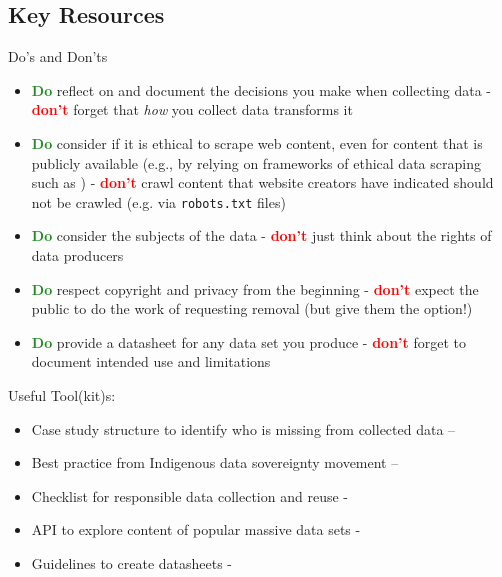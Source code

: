 \subsection{Key Resources}
Do's and Don'ts
\begin{itemize}
    \item \textcolor{ForestGreen}{\textbf{Do}} reflect on and document the decisions you make when collecting data - \textcolor{red}{\textbf{don't}} forget that \textit{how} you collect data transforms it 
    \item \textcolor{ForestGreen}{\textbf{Do}} consider if it is ethical to scrape web content, even for content that is publicly available (e.g., by relying on frameworks of ethical data scraping such as \citet{mancosu_what_2020}) - \textcolor{red}{\textbf{don't}} crawl content that website creators have indicated should not be crawled (e.g. via \texttt{robots.txt} files)
    \item \textcolor{ForestGreen}{\textbf{Do}} consider the subjects of the data - \textcolor{red}{\textbf{don't}} just think about the rights of data producers
    \item \textcolor{ForestGreen}{\textbf{Do}} respect copyright and privacy from the beginning - \textcolor{red}{\textbf{don't}} expect the public to do the work of requesting removal (but give them the option!)
    \item \textcolor{ForestGreen}{\textbf{Do}} provide a datasheet for any data set you produce - \textcolor{red}{\textbf{don't}} forget to document intended use and limitations
\end{itemize}

\noindent Useful Tool(kit)s: 
\begin{itemize}
    \item Case study structure to identify who is missing from collected data -- \citet{markl_mind_2022}
    \item Best practice from Indigenous data sovereignty movement -- \citet{walter_indigenous_2021}
    \item Checklist for responsible data collection and reuse - \citet{rogers_just_2021} 
    \item API to explore content of popular massive data sets - \citet{elazar_whats_2024} 
    \item Guidelines to create datasheets - \citet{gebru_datasheets_2020}
\end{itemize}